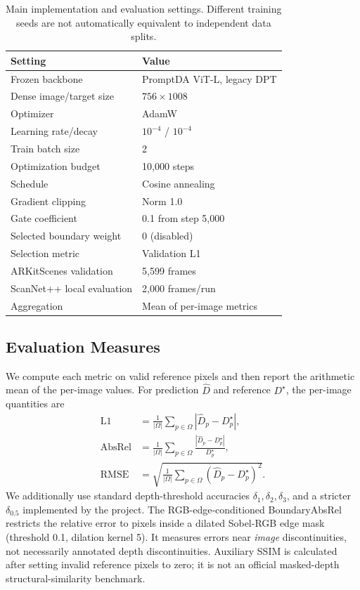 \begin{table}[t]
\caption{Main implementation and evaluation settings. Different training seeds are not automatically equivalent to independent data splits.}
\label{tab:protocol}
\centering\small
\begin{tabular}{@{}p{}p{}@{}}\toprule
Setting & Value\\ \midrule
Frozen backbone & PromptDA ViT-L, legacy DPT\\
Dense image/target size & $756\times1008$\\
Optimizer & AdamW\\
Learning rate/decay & $10^{-4}$ / $10^{-4}$\\
Train batch size & 2\\
Optimization budget & 10,000 steps\\
Schedule & Cosine annealing\\
Gradient clipping & Norm 1.0\\
Gate coefficient & 0.1 from step 5,000\\
Selected boundary weight & 0 (disabled)\\
Selection metric & Validation L1\\
ARKitScenes validation & 5,599 frames\\
ScanNet++ local evaluation & 2,000 frames/run\\
Aggregation & Mean of per-image metrics\\ \bottomrule
\end{tabular}
\end{table}

\subsection{Evaluation Measures}
We compute each metric on valid reference pixels and then report the arithmetic mean of the per-image values. For prediction $\widehat D$ and reference $D^\star$, the per-image quantities are
\begin{align}
\mathrm{L1}&=\frac1{|\Omega|}\sum_{p\in\Omega}|\widehat D_p-D^\star_p|,\\
\mathrm{AbsRel}&=\frac1{|\Omega|}\sum_{p\in\Omega}
\frac{|\widehat D_p-D^\star_p|}{D^\star_p},\\
\mathrm{RMSE}&=\sqrt{\frac1{|\Omega|}\sum_{p\in\Omega}
(\widehat D_p-D^\star_p)^2}.
\end{align}
We additionally use standard depth-threshold accuracies $\delta_1,\delta_2,\delta_3$, and a stricter $\delta_{0.5}$ implemented by the project. The RGB-edge-conditioned BoundaryAbsRel restricts the relative error to pixels inside a dilated Sobel-RGB edge mask (threshold 0.1, dilation kernel 5). It measures errors near \emph{image} discontinuities, not necessarily annotated depth discontinuities. Auxiliary SSIM is calculated after setting invalid reference pixels to zero; it is not an official masked-depth structural-similarity benchmark.

